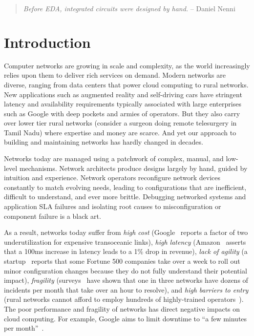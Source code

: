 \begin{quote}
{\em Before EDA, integrated circuits were designed by hand.} -- Daniel Nenni~\cite{wikicite}
\vspace{-2mm}
\end{quote}

\section{Introduction}

Computer networks are growing in scale and complexity, as the world increasingly relies upon them to deliver rich services on demand.  Modern networks are diverse, ranging from data centers that power cloud computing to rural networks.  New applications such as augmented reality and self-driving cars have stringent latency and availability requirements typically associated with large enterprises such as Google with deep pockets and armies of operators. But they also carry over lower tier rural networks (consider a surgeon doing remote telesurgery in Tamil Nadu) where expertise and money are scarce. And yet our approach to building and maintaining networks has hardly changed in decades.

Networks today are managed using a patchwork of complex, manual, and low-level mechanisms. Network architects produce designs largely by hand, guided by intuition and experience. Network operators reconfigure network devices constantly to match evolving needs, leading to configurations that are inefficient, difficult to understand, and ever more brittle.  Debugging
networked systems and application SLA failures and isolating root causes to
misconfiguration or component failure is a black art.

As a result, networks today suffer from {\em high cost} (Google~\cite{b4} reports a factor of two underutilization for expensive transoceanic links), {\em high latency} (Amazon~\cite{amazon} asserts that a 100ms increase in latency leads to a 1\% drop in revenue), {\em lack of agility} (a startup~\cite{mahajan} reports that some Fortune 500 companies take over a week to roll out minor configuration changes because they do not fully understand their potential impact), {\em fragility} (surveys~\cite{atpg} have shown that one in three networks have dozens of incidents per month that take over an hour to resolve), and {\em high barriers to entry} (rural networks cannot afford to employ hundreds of highly-trained operators~\cite{barathwisp}). The poor performance and fragility of networks has direct negative impacts on cloud computing. For example, Google aims to limit downtime to ``a few minutes per month''~\cite{rameshgoogle}.

